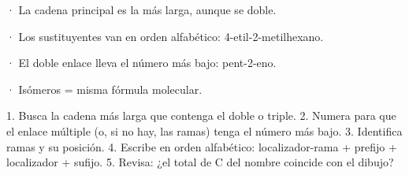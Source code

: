 \begin{clave}[{Recuerda}] · La cadena principal es la más larga, aunque se doble.\par · Los sustituyentes van en orden alfabético: 4-etil-2-metilhexano.\par · El doble enlace lleva el número más bajo: pent-2-eno.\par · Isómeros = misma fórmula molecular.\end{clave}
  
\begin{clave} 1. Busca la cadena más larga que contenga el doble o triple. 2. Numera para que el enlace múltiple (o, si no hay, las ramas) tenga el número más bajo. 3. Identifica ramas y su posición. 4. Escribe en orden alfabético: localizador-rama + prefijo + localizador + sufijo. 5. Revisa: ¿el total de C del nombre coincide con el dibujo?\end{clave}
